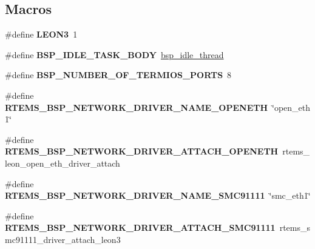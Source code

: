 \subsection*{Macros}
\begin{DoxyCompactItemize}
\item 
\mbox{\label{group__RTEMSBSPsSPARCLEON3_ga2f922ef83bb3695fa88bcb4581657f8d}} 
\#define {\bfseries L\+E\+O\+N3}~1
\item 
\mbox{\label{group__RTEMSBSPsSPARCLEON3_ga4aa606d0badadcc28e8054cb60f13b56}} 
\#define {\bfseries B\+S\+P\+\_\+\+I\+D\+L\+E\+\_\+\+T\+A\+S\+K\+\_\+\+B\+O\+DY}~\mbox{\hyperlink{group__RTEMSBSPsSPARCLEON3_ga301be7085b80c41a9c5887247003c662}{bsp\+\_\+idle\+\_\+thread}}
\item 
\mbox{\label{group__RTEMSBSPsSPARCLEON3_gacc66c026256a179dbe566201017a971b}} 
\#define {\bfseries B\+S\+P\+\_\+\+N\+U\+M\+B\+E\+R\+\_\+\+O\+F\+\_\+\+T\+E\+R\+M\+I\+O\+S\+\_\+\+P\+O\+R\+TS}~8
\item 
\mbox{\label{group__RTEMSBSPsSPARCLEON3_ga469743fc5030b02280a39194e031ca0b}} 
\#define {\bfseries R\+T\+E\+M\+S\+\_\+\+B\+S\+P\+\_\+\+N\+E\+T\+W\+O\+R\+K\+\_\+\+D\+R\+I\+V\+E\+R\+\_\+\+N\+A\+M\+E\+\_\+\+O\+P\+E\+N\+E\+TH}~\char`\"{}open\+\_\+eth1\char`\"{}
\item 
\mbox{\label{group__RTEMSBSPsSPARCLEON3_ga56ba3db9d91878886566baa96a5d9c10}} 
\#define {\bfseries R\+T\+E\+M\+S\+\_\+\+B\+S\+P\+\_\+\+N\+E\+T\+W\+O\+R\+K\+\_\+\+D\+R\+I\+V\+E\+R\+\_\+\+A\+T\+T\+A\+C\+H\+\_\+\+O\+P\+E\+N\+E\+TH}~rtems\+\_\+leon\+\_\+open\+\_\+eth\+\_\+driver\+\_\+attach
\item 
\mbox{\label{group__RTEMSBSPsSPARCLEON3_ga0e31f8f88baea5ef98001cfea93ffae3}} 
\#define {\bfseries R\+T\+E\+M\+S\+\_\+\+B\+S\+P\+\_\+\+N\+E\+T\+W\+O\+R\+K\+\_\+\+D\+R\+I\+V\+E\+R\+\_\+\+N\+A\+M\+E\+\_\+\+S\+M\+C91111}~\char`\"{}smc\+\_\+eth1\char`\"{}
\item 
\mbox{\label{group__RTEMSBSPsSPARCLEON3_gac19c3d15ed91b7280a65680c42fa1500}} 
\#define {\bfseries R\+T\+E\+M\+S\+\_\+\+B\+S\+P\+\_\+\+N\+E\+T\+W\+O\+R\+K\+\_\+\+D\+R\+I\+V\+E\+R\+\_\+\+A\+T\+T\+A\+C\+H\+\_\+\+S\+M\+C91111}~rtems\+\_\+smc91111\+\_\+driver\+\_\+attach\+\_\+leon3

\end{DoxyCompactItemize}
